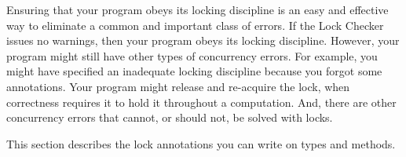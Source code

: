 Ensuring that your program obeys its locking discipline is an easy and
effective way to eliminate a common and important class of errors.
If the Lock Checker issues no warnings, then your program obeys its locking discipline.
However, your program might still have other types of concurrency errors.
%
For example, you might have specified an inadequate locking discipline
because you forgot some 
annotations.
%
Your program might release and
re-acquire the lock, when correctness requires it to hold it throughout a
computation.
%
And, there are other concurrency errors that cannot, or
should not, be solved with locks.


This section describes the lock annotations you can write on types and methods.



